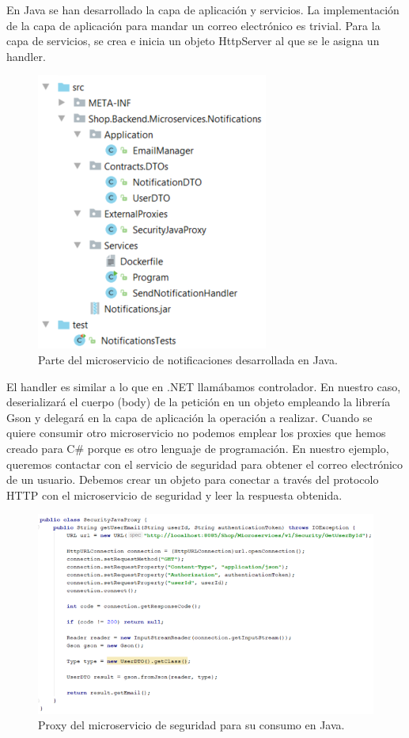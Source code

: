 \documentclass[11pt,spanish,listoffigures]{tfgetsinf}
\begin{document}
En Java se han desarrollado la capa de aplicación y servicios. La implementación de la capa de aplicación para mandar un correo electrónico es trivial. Para la capa de servicios, se crea e inicia un objeto HttpServer al que se le asigna un handler.

\begin{figure}[h]
\centering
\includegraphics[scale=0.85]{NotificationsJava}
\caption{Parte del microservicio de notificaciones desarrollada en Java.}
\end{figure}

El handler es similar a lo que en .NET llamábamos controlador. En nuestro caso, deserializará el cuerpo (body) de la petición en un objeto empleando la librería Gson y delegará en la capa de aplicación la operación a realizar. Cuando se quiere consumir otro microservicio no podemos emplear los proxies que hemos creado para C\# porque es otro lenguaje de programación. En nuestro ejemplo, queremos contactar con el servicio de seguridad para obtener el correo electrónico de un usuario. Debemos crear un objeto para conectar a través del protocolo HTTP con el microservicio de seguridad y leer la respuesta obtenida.

\begin{figure}[h]
\centering
\includegraphics[scale=0.85]{JavaProxy}
\caption{Proxy del microservicio de seguridad para su consumo en Java.}
\end{figure}
\end{document}
